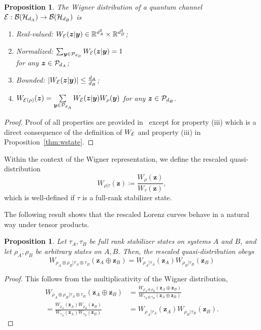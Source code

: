 \documentclass[
twocolumn,
superscriptaddress
]{revtex4-1}
\newtheorem{proposition}[theorem]{Proposition}
\def\y{\boldsymbol{y}}
\def\z{\boldsymbol{z}}
\def\H{{\cal H}}
\def\E{{\cal E}}
\renewcommand{\P}{{\cal P}}
\begin{document}
\begin{proposition}
    \label{thm:wchannel}
    The Wigner distribution of a quantum channel $\E: {\cal B}(\H_{d_A}) \rightarrow {\cal B}(\H_{d_B})$ is
    \begin{enumerate}
        \item[(i)]\label{en:wo1} Real-valued: $W_{\E}(\z|\y) \in \mathbb{R}^{d_A^2} \times \mathbb{R}^{d_B^2}$;
        \item[(ii)]\label{en:wo2} Normalized: $\sum_{\y \in \P_{d_{\scalebox{.9}{$\scriptscriptstyle B$}}}} W_{\E}(\z|\y) = 1$ \\ 
        for any $\z \in \P_{d_A}$;
        \item[(iii)]\label{en:wo3} Bounded: $\abs{W_{\E}(\z|\y)} \leq \frac{d_A}{d_B}$;
	    \item[(iv)]\label{en:wo4} $W_{\E(\rho)}(\z) = \sum\limits_{\y \in \P_{d_{A}}} W_{\E}(\z|\y) W_\rho(\y)$ for any $\z \in \P_{d_B}$.
    \end{enumerate}
\end{proposition}
\begin{proof}
	Proof of all properties are provided in~\cite{Wang_2019} except for property (iii) which is a direct consequence of the definition of $W_{\E}$ and property (iii) in Proposition~\ref{thm:wstate}.
\end{proof}

Within the context of the Wigner representation, we define the rescaled quasi-distribution
\begin{equation}
	W_{\rho|\tau}(\z) \coloneqq \frac{W_\rho (\z) }{ W_\tau(\z)},
\end{equation}
which is well-defined if $\tau$ is a full-rank stabilizer state.

The following result shows that the rescaled Lorenz curves behave in a natural way under tensor products. 
\begin{proposition}\label{prop:rescaled_multi}
	Let $\tau_A, \tau_B$ be full rank stabilizer states on systems $A$ and $B$, and let $\rho_A, \rho_B$ be arbitrary states on $A,B$. Then, the rescaled quasi-distribution obeys
\begin{equation}
W_{\rho_A \otimes \rho_B | \tau_A \otimes \tau_B}(\z_A \oplus \z_B) =W_{\rho_A | \tau_A}(\z_A) W_{\rho_B | \tau_B}(\z_B)
\end{equation}
\end{proposition}
\begin{proof} This follows from the multiplicativity of the Wigner distribution,
\begin{align}
W_{\rho_A \otimes \rho_B | \tau_A \otimes \tau_B}(\z_A \oplus \z_B) &= \frac{W_{\rho_A \otimes \rho_B} (\z_A \oplus \z_B)}{W_{\tau_A \otimes \tau_B} (\z_A \oplus \z_B)}\nonumber \\
 = \frac{W_{\rho_A } (\z_A )W_{\rho_B } (\z_B )}{W_{\tau_A } (\z_A )W_{\tau_B } (\z_B )} &= W_{\rho_A | \tau_A}(\z_A) W_{\rho_B | \tau_B}(\z_B). \nonumber
\end{align}
\end{proof}
\end{document}
